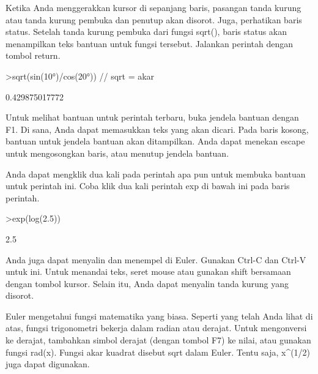 \documentclass[a4paper,10pt]{article}
\begin{document}
\begin{eulernotebook}
\begin{eulercomment}
Ketika Anda menggerakkan kursor di sepanjang baris, pasangan tanda
kurung atau tanda kurung pembuka dan penutup akan disorot. Juga,
perhatikan baris status. Setelah tanda kurung pembuka dari fungsi
sqrt(), baris status akan menampilkan teks bantuan untuk fungsi
tersebut. Jalankan perintah dengan tombol return.
\end{eulercomment}
\begin{eulerprompt}
>sqrt(sin(10°)/cos(20°)) // sqrt = akar
\end{eulerprompt}
\begin{euleroutput}
  0.429875017772
\end{euleroutput}
\begin{eulercomment}
Untuk melihat bantuan untuk perintah terbaru, buka jendela bantuan
dengan F1. Di sana, Anda dapat memasukkan teks yang akan dicari. Pada
baris kosong, bantuan untuk jendela bantuan akan ditampilkan. Anda
dapat menekan escape untuk mengosongkan baris, atau menutup jendela
bantuan.

Anda dapat mengklik dua kali pada perintah apa pun untuk membuka
bantuan untuk perintah ini. Coba klik dua kali perintah exp di bawah
ini pada baris perintah.
\end{eulercomment}
\begin{eulerprompt}
>exp(log(2.5))
\end{eulerprompt}
\begin{euleroutput}
  2.5
\end{euleroutput}
\begin{eulercomment}
Anda juga dapat menyalin dan menempel di Euler. Gunakan Ctrl-C dan
Ctrl-V untuk ini. Untuk menandai teks, seret mouse atau gunakan shift
bersamaan dengan tombol kursor. Selain itu, Anda dapat menyalin tanda
kurung yang disorot.
\end{eulercomment}
\begin{eulercomment}
\end{eulercomment}
\begin{eulercomment}
Euler mengetahui fungsi matematika yang biasa. Seperti yang telah Anda
lihat di atas, fungsi trigonometri bekerja dalam radian atau derajat.
Untuk mengonversi ke derajat, tambahkan simbol derajat (dengan tombol
F7) ke nilai, atau gunakan fungsi rad(x). Fungsi akar kuadrat disebut
sqrt dalam Euler. Tentu saja, x\textasciicircum{}(1/2) juga dapat digunakan.


\end{eulercomment}
\end{eulernotebook}
\end{document}
